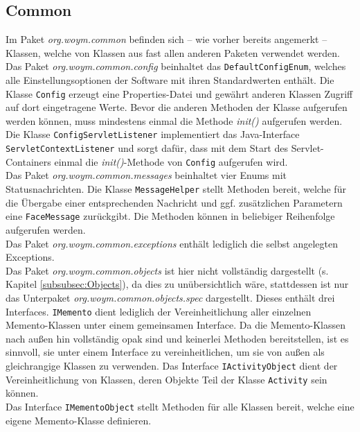 \documentclass[fontsize=12pt,paper=a4,twoside]{scrartcl}
\begin{document}
\subsection{Common}
\label{subsec:Common}
Im Paket \textit{org.woym.common} befinden sich -- wie vorher bereits angemerkt -- Klassen, welche von Klassen aus fast allen anderen Paketen verwendet werden.\\
Das Paket \textit{org.woym.common.config} beinhaltet das \texttt{DefaultConfigEnum}, welches alle Einstellungsoptionen der Software mit ihren Standardwerten enthält. Die Klasse \texttt{Config} erzeugt eine Properties-Datei und gewährt anderen Klassen Zugriff auf dort eingetragene Werte. Bevor die anderen Methoden der Klasse aufgerufen werden können, muss mindestens einmal die Methode \textit{init()} aufgerufen werden. 
\\
Die Klasse \texttt{ConfigServletListener} implementiert das Java-Interface \texttt{ServletContextListener} und sorgt dafür, dass mit dem Start des Servlet-Containers einmal die \textit{init()}-Methode von \texttt{Config} aufgerufen wird.\\

Das Paket \textit{org.woym.common.messages} beinhaltet vier Enums mit Statusnachrichten. Die Klasse \texttt{MessageHelper} stellt Methoden bereit, welche für die Übergabe einer entsprechenden Nachricht und ggf. zusätzlichen Parametern eine \texttt{FaceMessage} zurückgibt. Die Methoden können in beliebiger Reihenfolge aufgerufen werden.\\

Das Paket \textit{org.woym.common.exceptions} enthält lediglich die selbst angelegten Exceptions. \\

Das Paket \textit{org.woym.common.objects} ist hier nicht vollständig dargestellt (s. Kapitel \ref{subsubsec:Objects}), da dies zu unübersichtlich wäre, stattdessen ist nur das Unterpaket \textit{org.woym.common.objects.spec} dargestellt. Dieses enthält drei Interfaces. \texttt{IMemento} dient lediglich der Vereinheitlichung aller einzelnen Memento-Klassen unter einem gemeinsamen Interface. Da die Memento-Klassen nach außen hin vollständig opak sind und keinerlei Methoden bereitstellen, ist es sinnvoll, sie unter einem Interface zu vereinheitlichen, um sie von außen als gleichrangige Klassen zu verwenden. Das Interface \texttt{IActivityObject} dient der Vereinheitlichung von Klassen, deren Objekte Teil der Klasse \texttt{Activity} sein können. \\
Das Interface \texttt{IMementoObject} stellt Methoden für alle Klassen bereit, welche eine eigene Memento-Klasse definieren.\clearpage
\end{document}
